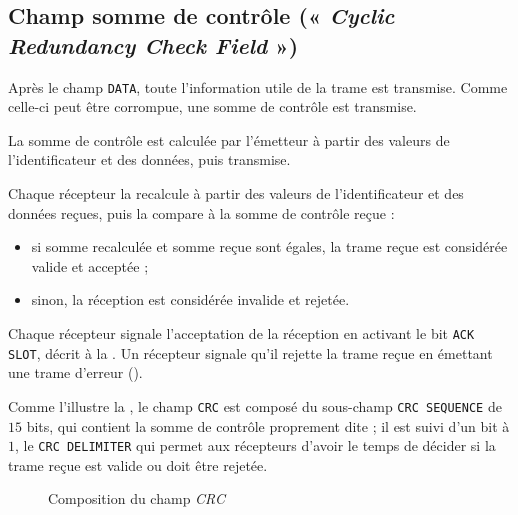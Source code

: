 \subsection{Champ somme de contrôle (« \emph{Cyclic Redundancy Check Field} »)}

Après le champ \texttt{DATA}, toute l'information utile de la trame est transmise. Comme celle-ci peut être corrompue, une somme de contrôle est transmise. 

La somme de contrôle est calculée par l'émetteur à partir des valeurs de l'identificateur et des données, puis transmise.

Chaque récepteur la recalcule à partir des valeurs de l'identificateur et des données reçues, puis la compare à la somme de contrôle reçue :
\begin{itemize}
  \item si somme recalculée et somme reçue sont égales, la trame reçue est considérée valide et acceptée ;
  \item sinon, la réception est considérée invalide et rejetée.
\end{itemize}

Chaque récepteur signale l'acceptation de la réception en activant le bit \texttt{ACK SLOT}, décrit à la . Un récepteur signale qu'il rejette la trame reçue en émettant une trame d'erreur ().

Comme l'illustre la , le champ \texttt{CRC} est composé du sous-champ \texttt{CRC SEQUENCE} de $15$ bits, qui contient la somme de contrôle proprement dite ; il est suivi d'un bit à $1$, le \texttt{CRC DELIMITER} qui permet aux récepteurs d'avoir le temps de décider si la trame reçue est valide ou doit être rejetée.

\begin{figure}[h]
  \centering
  \caption{Composition du champ \emph{CRC}}
\end{figure}


